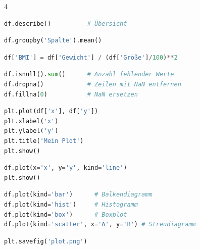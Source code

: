 \begin{landscape}
\begin{multicols*}{4}
\begin{cheatSheetBox}[title=Statistiken]
\begin{lstlisting}[language=Python]
df.describe()          # Übersicht
\end{lstlisting}
\end{cheatSheetBox}

\begin{cheatSheetBox}[title=Gruppieren]
\begin{lstlisting}[language=Python]
df.groupby('Spalte').mean()
\end{lstlisting}
\end{cheatSheetBox}

\begin{cheatSheetBox}[title=Neue Spalte erstellen]
\begin{lstlisting}[language=Python]
df['BMI'] = df['Gewicht'] / (df['Größe']/100)**2
\end{lstlisting}
\end{cheatSheetBox}

\begin{cheatSheetBox}[title=Fehlende Werte]
\begin{lstlisting}[language=Python]
df.isnull().sum()      # Anzahl fehlender Werte
df.dropna()            # Zeilen mit NaN entfernen
df.fillna(0)           # NaN ersetzen
\end{lstlisting}
\end{cheatSheetBox}

\begin{cheatSheetBox}[title=Plotten mit Matplotlib]
\begin{lstlisting}[language=Python]
plt.plot(df['x'], df['y'])
plt.xlabel('x')
plt.ylabel('y')
plt.title('Mein Plot')
plt.show()
\end{lstlisting}
\end{cheatSheetBox}

\begin{cheatSheetBox}[title=Schnelles Plotten mit Pandas]
\begin{lstlisting}[language=Python]
df.plot(x='x', y='y', kind='line')
plt.show()
\end{lstlisting}
\end{cheatSheetBox}

\begin{cheatSheetBox}[title=Weitere Plottypen]
\begin{lstlisting}[language=Python]
df.plot(kind='bar')      # Balkendiagramm
df.plot(kind='hist')     # Histogramm
df.plot(kind='box')      # Boxplot
df.plot(kind='scatter', x='A', y='B') # Streudiagramm
\end{lstlisting}
\end{cheatSheetBox}

\begin{cheatSheetBox}[title=Speichern als Bild]
\begin{lstlisting}[language=Python]
plt.savefig('plot.png')
\end{lstlisting}
\end{cheatSheetBox}

\end{multicols*}
\end{landscape}
